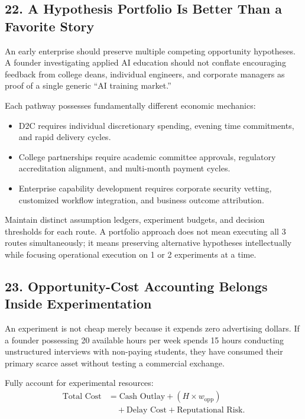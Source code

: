 \subsection*{22. A Hypothesis Portfolio Is Better Than a Favorite Story}

An early enterprise should preserve multiple competing opportunity hypotheses. A founder investigating applied AI education should not conflate encouraging feedback from college deans, individual engineers, and corporate managers as proof of a single generic ``AI training market.''

Each pathway possesses fundamentally different economic mechanics:
\begin{itemize}
    \item D2C requires individual discretionary spending, evening time commitments, and rapid delivery cycles.
    \item College partnerships require academic committee approvals, regulatory accreditation alignment, and multi-month payment cycles.
    \item Enterprise capability development requires corporate security vetting, customized workflow integration, and business outcome attribution.
\end{itemize}

Maintain distinct assumption ledgers, experiment budgets, and decision thresholds for each route. A portfolio approach does not mean executing all 3 routes simultaneously; it means preserving alternative hypotheses intellectually while focusing operational execution on 1 or 2 experiments at a time.

\subsection*{23. Opportunity-Cost Accounting Belongs Inside Experimentation}

An experiment is not cheap merely because it expends zero advertising dollars. If a founder possessing 20 available hours per week spends 15 hours conducting unstructured interviews with non-paying students, they have consumed their primary scarce asset without testing a commercial exchange.

Fully account for experimental resources:
\begin{equation}
\begin{aligned}
\text{Total Cost} &= \text{Cash Outlay} + (H \times w_{\text{opp}}) \\
&\quad + \text{Delay Cost} + \text{Reputational Risk}.
\end{aligned}
\end{equation}

